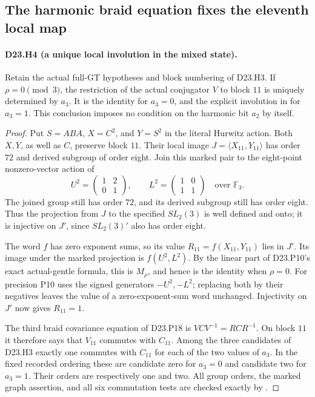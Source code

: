 \subsection{The harmonic braid equation fixes the eleventh local map}

\paragraph{D23.H4 (a unique local involution in the mixed state).}
Retain the actual full-GT hypotheses and block numbering of
D23.H3. If $\rho=0\pmod3$, the restriction of the actual
conjugator $V$ to block $11$ is uniquely determined by $a_3$.
It is the identity for $a_3=0$, and the explicit involution
in  for $a_3=1$.
This conclusion imposes no condition on the harmonic bit
$a_2$ by itself.

\begin{proof}
Put $S=ABA$, $X=C^2$, and $Y=S^2$ in the literal Hurwitz
action. Both $X,Y$, as well as $C$, preserve block $11$.
Their local image $J=\langle X_{11},Y_{11}\rangle$ has
order $72$ and derived subgroup of order eight. Join this
marked pair to the eight-point nonzero-vector action of
\[
 U^2=\begin{pmatrix}1&2\\0&1\end{pmatrix},\qquad
 L^2=\begin{pmatrix}1&0\\1&1\end{pmatrix}
          \quad\text{over }\mathbb F_3.
\]
The joined group still has order $72$, and its derived
subgroup still has order eight. Thus the projection from
$J$ to the specified $SL_2(3)$ is well defined and onto;
it is injective on $J'$, since $SL_2(3)'$ also has order
eight.

The word $f$ has zero exponent sums, so its value
$R_{11}=f(X_{11},Y_{11})$ lies in $J'$. Its image under
the marked projection is $f(U^2,L^2)$. By the linear
part of D23.P10's exact actual-gentle formula, this is
$M_\rho$, and hence is the identity when $\rho=0$.
For precision P10 uses the signed generators $-U^2,-L^2$;
replacing both by their negatives leaves the value of a
zero-exponent-sum word unchanged. Injectivity on $J'$ now
gives $R_{11}=1$.

The third braid covariance equation of D23.P18 is
$VCV^{-1}=RCR^{-1}$. On block $11$ it therefore says
that $V_{11}$ commutes with $C_{11}$. Among the three
candidates of D23.H3 exactly one commutes with $C_{11}$
for each of the two values of $a_3$. In the fixed recorded
ordering these are candidate zero for $a_3=0$ and candidate
two for $a_3=1$. Their orders are respectively one and two.
All group orders, the marked graph assertion, and all six
commutation tests are checked exactly by
.
\end{proof}
